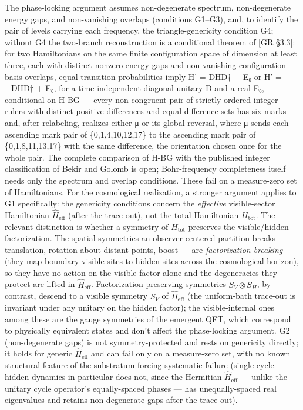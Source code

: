 \documentclass[
]{article}
\begin{document}
The phase-locking argument assumes non-degenerate spectrum,
non-degenerate energy gaps, and non-vanishing overlaps (conditions
G1--G3), and, to identify the pair of levels carrying each frequency,
the triangle-genericity condition G4; without G4 the two-branch
reconstruction is a conditional theorem of {[}GR §3.3{]}: for two
Hamiltonians on the same finite configuration space of dimension at
least three, each with distinct nonzero energy gaps and non-vanishing
configuration-basis overlaps, equal transition probabilities imply H' =
DHD† + E₀ or H' = −DH̄D† + E₀, for a time-independent diagonal unitary D
and a real E₀, conditional on H-BG --- every non-congruent pair of
strictly ordered integer rulers with distinct positive differences and
equal difference sets has six marks and, after relabeling, realizes
either μ or its global reversal, where μ sends each ascending mark pair
of \{0,1,4,10,12,17\} to the ascending mark pair of \{0,1,8,11,13,17\}
with the same difference, the orientation chosen once for the whole
pair. The complete comparison of H-BG with the published integer
classification of Bekir and Golomb is open; Bohr-frequency completeness
itself needs only the spectrum and overlap conditions. These fail on a
measure-zero set of Hamiltonians. For the cosmological realization, a
stronger argument applies to G1 specifically: the genericity conditions
concern the \emph{effective} visible-sector Hamiltonian
\(\hat{H}_{\text{eff}}\) (after the trace-out), not the total
Hamiltonian \(H_{\text{tot}}\). The relevant distinction is whether a
symmetry of \(H_{\text{tot}}\) preserves the visible/hidden
factorization. The spatial symmetries an observer-centered partition
breaks --- translation, rotation about distant points, boost --- are
\emph{factorization-breaking} (they map boundary visible sites to hidden
sites across the cosmological horizon), so they have no action on the
visible factor alone and the degeneracies they protect are lifted in
\(\hat{H}_{\text{eff}}\). Factorization-preserving symmetries
\(S_V\otimes S_H\), by contrast, descend to a visible symmetry \(S_V\)
of \(\hat{H}_{\text{eff}}\) (the uniform-bath trace-out is invariant
under any unitary on the hidden factor); the visible-internal ones among
these are the gauge symmetries of the emergent QFT, which correspond to
physically equivalent states and don't affect the phase-locking
argument. G2 (non-degenerate gaps) is not symmetry-protected and rests
on genericity directly; it holds for generic \(\hat{H}_{\text{eff}}\)
and can fail only on a measure-zero set, with no known structural
feature of the substratum forcing systematic failure (single-cycle
hidden dynamics in particular does not, since the Hermitian
\(\hat{H}_{\text{eff}}\) --- unlike the unitary cycle operator's
equally-spaced phases --- has unequally-spaced real eigenvalues and
retains non-degenerate gaps after the trace-out).
\end{document}
